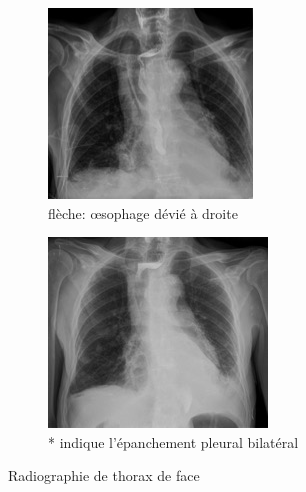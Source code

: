 \documentclass[./tfe]{subfiles}
\begin{document}
\begin{figure}[!h]
    \centering
    
    \begin{subfigure}[b]{.5\textwidth}
        \includegraphics[width=.9\textwidth]{images/rx_esophage_devie_a_droite.jpg}
        \caption{flèche: œsophage dévié à droite}
        \label{fig:rx_1}
    \end{subfigure}%
%
    \begin{subfigure}[b]{.5\textwidth}
        \includegraphics[width=.9\textwidth]{images/rx_epanchement_pleural_bilateral.jpg}
        \caption{* indique l’épanchement pleural bilatéral}
        \label{fig:rx_2}
    \end{subfigure}
    
\caption{Radiographie de thorax de face}
\label{fig:rx_esophage}
\end{figure}
\end{document}
